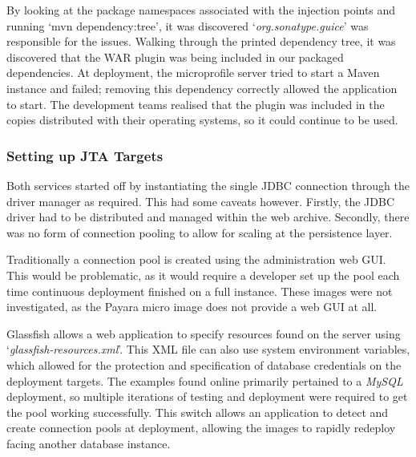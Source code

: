 By looking at the package namespaces associated with the injection points and running `mvn dependency:tree', it was discovered `\textit{org.sonatype.guice}' was responsible for the issues. Walking through the printed dependency tree, it was discovered that the WAR plugin was being included in our packaged dependencies. At deployment, the microprofile server tried to start a Maven instance and failed; removing this dependency correctly allowed the application to start. The development teams realised that the plugin was included in the copies distributed with their operating systems, so it could continue to be used.

\label{JTA_Targets}
\subsubsection{Setting up JTA Targets}
Both services started off by instantiating the single JDBC connection through the driver manager as required. This had some caveats however. Firstly, the JDBC driver had to be distributed and managed within the web archive. Secondly, there was no form of connection pooling to allow for scaling at the persistence layer.

Traditionally a connection pool is created using the administration web GUI. This would be problematic, as it would require a developer set up the pool each time continuous deployment finished on a full instance. These images were not investigated, as the Payara micro image does not provide a web GUI at all.

Glassfish allows a web application to specify resources found on the server using `\textit{glassfish-resources.xml}'. This XML file can also use system environment variables, which allowed for the protection and specification of database credentials on the deployment targets. The examples found online primarily pertained to a \textit{MySQL} deployment, so multiple iterations of testing and deployment were required to get the pool working successfully. This switch allows an application to detect and create connection pools at deployment, allowing the images to rapidly redeploy facing another database instance.
